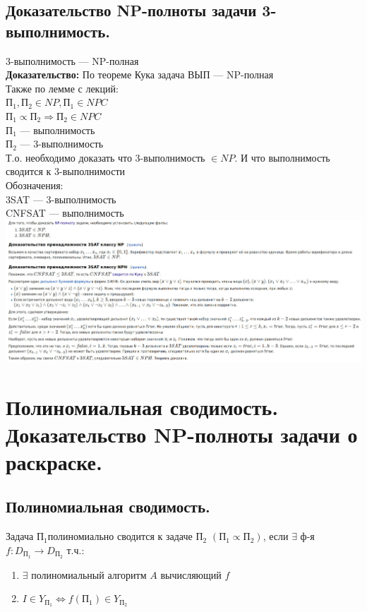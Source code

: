 \documentclass[12pt]{article}
\begin{document}
\subsection{Доказательство NP-полноты задачи 3-выполнимость.}
	3-выполнимость — NP-полная\\
	\textbf{Доказательство:}
		По теореме Кука задача ВЫП — NP-полная\\
		Также по лемме с лекций:\\
		$П_1, П_2 \in NP, П_1 \in NPC$\\
		$П_1 \propto П_2 \Rightarrow П_2 \in NPC$\\
		$П_1$ — выполнимость\\
		$П_2$ — 3-выполнимость\\
		Т.о. необходимо доказать что 3-выполнимость $\in NP$. И что выполнимость сводится к 3-выполнимости\\
		Обозначения:\\
		3SAT — 3-выполнимость\\
		CNFSAT — выполнимость\\
		\includegraphics[width=580pt]{63}
	\qedsymbol

\section{Полиномиальная сводимость. Доказательство NP-полноты задачи о раскраске.}
\subsection{Полиномиальная сводимость.}
	Задача $П_1$полиномиально сводится к задаче $П_2$ $(П_1 \propto П_2)$, если $\exists$ ф-я $f: D_{П_1} \to D_{П_2}$ т.ч.:
	\begin{enumerate}
		\item $\exists$ полиномиальный алгоритм $A$ вычисляющий $f$
		\item $I \in Y_{П_1} \Leftrightarrow f(П_1) \in Y_{П_2}$
	\end{enumerate}
\end{document}

